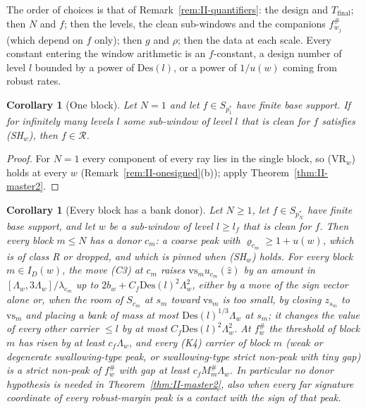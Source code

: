 \documentclass[10pt]{amsart}
\newtheorem{corollary}[theorem]{Corollary}
\theoremstyle{definition}
\theoremstyle{remark}
\newcommand{\Rec}{\mathcal R}
\newcommand{\zh}{\hat z}
\begin{document}
The order of choices is that of Remark~\ref{rem:II-quantifiers}: the design
and $T_{\mathrm{final}}$; then $N$ and $f$; then the levels, the clean
sub-windows and the companions $f^\#_{w_j}$ (which depend on $f$ only);
then $g$ and $\rho$; then the data at each scale.  Every constant entering
the window arithmetic is an $f$-constant, a design number of level $l$
bounded by a power of $\mathrm{Des}(l)$, or a power of $1/u(w)$ coming from
robust rates.

\begin{corollary}[One block]\label{cor:II-master2N1}
Let $N=1$ and let $f\in S_{p_1^*}$ have finite base support.  If for
infinitely many levels $l$ some sub-window of level $l$ that is clean for $f$
satisfies \textup{(SH$_w$)}, then $f\in\Rec$.
\end{corollary}

\begin{proof}
For $N=1$ every component of every ray lies in the single block, so
(VR$_w$) holds at every $w$ (Remark~\ref{rem:II-onesigned}(b)); apply
Theorem~\ref{thm:II-master2}.
\end{proof}

\begin{corollary}[Every block has a bank donor]\label{cor:II-AC}
Let $N\ge1$, let $f\in S_{p_N^*}$ have finite base support, and let $w$ be
a sub-window of level $l\ge l_f$ that is clean for $f$.  Then every block
$m\le N$ has a donor $c_m$: a coarse peak with $\varrho_{c_m}\ge1+u(w)$, which
is of class R or dropped, and which is pinned when \textup{(SH$_w$)} holds.
For every block $m\in I_D(w)$, the move \textup{(C3)} at $c_m$ raises
$\mathrm{vs}_mu_{c_m}(\zh)$ by an amount in $[\Lambda_w,3\Lambda_w]/
\lambda_{c_m}$ up to $2b_w+C_f\mathrm{Des}(l)^2\Lambda_w^2$, either by a move
of the sign vector alone or, when the room of $S_{c_m}$ at $s_m$ toward
$\mathrm{vs}_m$ is too small, by closing $z_{s_m}$ to $\mathrm{vs}_m$ and
placing a bank of mass at most $\mathrm{Des}(l)^{1/3}\Lambda_w$ at $s_m$; it
changes the value of every other carrier $\le l$ by at most $C_f
\mathrm{Des}(l)^2\Lambda_w^2$.  At $f^\#_w$ the threshold of block $m$ has
risen by at least $c_f\Lambda_w$, and every \textup{(K4)} carrier of block $m$
\textup{(}weak or degenerate swallowing-type peak, or swallowing-type strict
non-peak with tiny gap\textup{)} is a strict non-peak of $f^\#_w$ with gap at
least $c_fM^\#_m\Lambda_w$.  In particular no donor hypothesis is needed in
Theorem~\ref{thm:II-master2}, also when every far signature coordinate of
every robust-margin peak is a contact with the sign of that peak.
\end{corollary}
\end{document}
